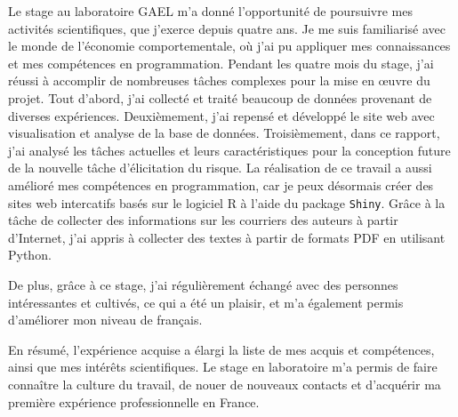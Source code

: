 \documentclass[12pt]{article}
\begin{document}
Le stage au laboratoire GAEL m'a donné l'opportunité de poursuivre mes
activités scientifiques, que j'exerce depuis quatre ans. Je me suis
familiarisé avec le monde de l'économie comportementale, où j'ai pu
appliquer mes connaissances et mes compétences en programmation. Pendant
les quatre mois du stage, j'ai réussi à accomplir de nombreuses tâches
complexes pour la mise en œuvre du projet. Tout d'abord, j'ai collecté
et traité beaucoup de données provenant de diverses expériences.
Deuxièmement, j'ai repensé et développé le site web avec visualisation
et analyse de la base de données. Troisièmement, dans ce rapport, j'ai
analysé les tâches actuelles et leurs caractéristiques pour la
conception future de la nouvelle tâche d'élicitation du risque. La
réalisation de ce travail a aussi amélioré mes compétences en
programmation, car je peux désormais créer des sites web intercatifs
basés sur le logiciel R à l'aide du package \texttt{Shiny}. Grâce à la
tâche de collecter des informations sur les courriers des auteurs à
partir d'Internet, j'ai appris à collecter des textes à partir de
formats PDF en utilisant Python.

De plus, grâce à ce stage, j'ai régulièrement échangé avec des personnes
intéressantes et cultivés, ce qui a été un plaisir, et m'a également
permis d'améliorer mon niveau de français.

En résumé, l'expérience acquise a élargi la liste de mes acquis et
compétences, ainsi que mes intérêts scientifiques. Le stage en
laboratoire m'a permis de faire connaître la culture du travail, de
nouer de nouveaux contacts et d'acquérir ma première expérience
professionnelle en France.



\end{document}
